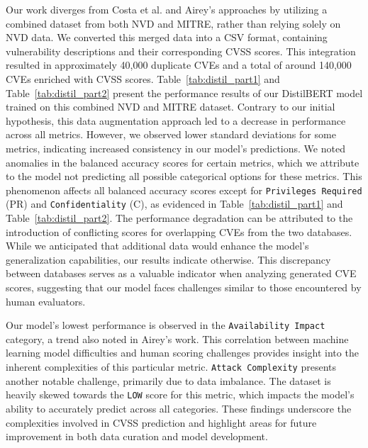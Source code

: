 \documentclass[12pt]{article}
\begin{document}
Our work diverges from Costa et al. and Airey's approaches by utilizing a combined dataset from both
NVD and MITRE, rather than relying solely on NVD data. We converted this merged data into a CSV
format, containing vulnerability descriptions and their corresponding CVSS scores. This integration
resulted in approximately 40,000 duplicate CVEs and a total of around 140,000 CVEs enriched with
CVSS scores. Table~\ref{tab:distil_part1} and Table~\ref{tab:distil_part2} present the performance
results of our DistilBERT model trained on this combined NVD and MITRE dataset. Contrary to our
initial hypothesis, this data augmentation approach led to a decrease in performance across all
metrics. However, we observed lower standard deviations for some metrics, indicating increased
consistency in our model's predictions. We noted anomalies in the balanced accuracy scores for
certain metrics, which we attribute to the model not predicting all possible categorical options for
these metrics. This phenomenon affects all balanced accuracy scores except for \texttt{Privileges
	Required}
(PR) and \texttt{Confidentiality} (C), as evidenced in Table~\ref{tab:distil_part1} and
Table~\ref{tab:distil_part2}. The performance degradation can be attributed to the introduction of
conflicting scores for overlapping CVEs from the two databases. While we anticipated that additional
data would enhance the model's generalization capabilities, our results indicate otherwise. This
discrepancy between databases serves as a valuable indicator when analyzing generated CVE scores,
suggesting that our model faces challenges similar to those encountered by human evaluators.

Our model's lowest performance is observed in the \texttt{Availability Impact} category, a trend
also noted in Airey's work. This correlation between machine learning model difficulties and human
scoring challenges provides insight into the inherent complexities of this particular metric.
\texttt{Attack Complexity} presents another notable challenge, primarily due to data imbalance. The
dataset is heavily skewed towards the \texttt{LOW} score for this metric, which impacts the model's ability
to accurately predict across all categories. These findings underscore the complexities involved in
CVSS prediction and highlight areas for future improvement in both data curation and model
development.
\end{document}
